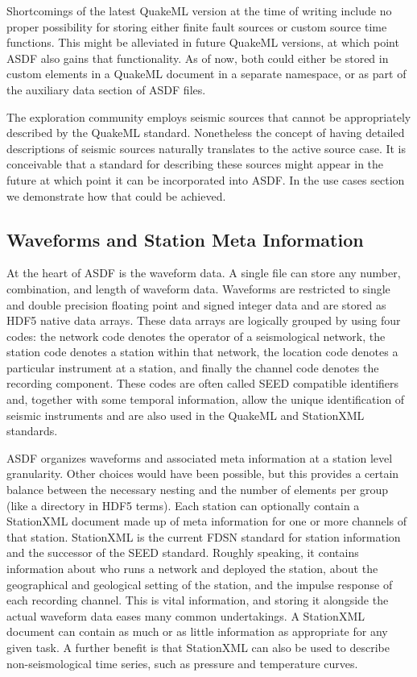Shortcomings of the latest QuakeML version at the time of writing include no
proper possibility for storing either finite fault sources or custom source
time functions. This might be alleviated in future QuakeML versions, at which
point ASDF also gains that functionality. As of now, both could either be
stored in custom elements in a QuakeML document in a separate namespace, or as
part of the auxiliary data section of ASDF files.

The exploration community employs seismic sources that cannot be appropriately
described by the QuakeML standard. Nonetheless the concept of having detailed
descriptions of seismic sources naturally translates to the active source case.
It is conceivable that a standard for describing these sources might appear in
the future at which point it can be incorporated into ASDF. In the use cases
section we demonstrate how that could be achieved.


\subsection{Waveforms and Station Meta Information}

At the heart of ASDF is the waveform data. A single file can store any number,
combination, and length of waveform data. Waveforms are restricted to single
and double precision floating point and signed integer data and are stored as
HDF5 native data arrays. These data arrays are logically grouped by using four
codes: the network code denotes the operator of a seismological network, the
station code denotes a station within that network, the location code denotes a
particular instrument at a station, and finally the channel code denotes the
recording component.  These codes are often called SEED compatible identifiers
\cite{SEEDManual} and, together with some temporal information, allow the
unique identification of seismic instruments and are also used in the QuakeML
and StationXML standards.

ASDF organizes waveforms and associated meta information at a station level
granularity. Other choices would have been possible, but this provides a
certain balance between the necessary nesting and the number of elements per
group (like a directory in HDF5 terms).
Each station can optionally contain a StationXML document made up of meta
information for one or more channels of that station. StationXML is the current
FDSN standard for station information and the successor of the SEED standard.
Roughly speaking, it contains information about who runs a network and deployed
the station, about the geographical and geological setting of the station, and
the impulse response of each recording channel.  This is vital information, and
storing it alongside the actual waveform data eases many common undertakings. A
StationXML document can contain as much or as little information as appropriate
for any given task.  A further benefit is that StationXML can also be used to
describe non-seismological time series, such as pressure and temperature
curves.

